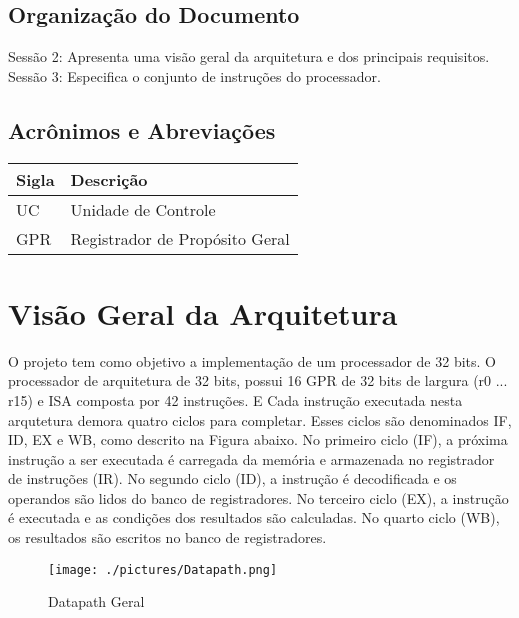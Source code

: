 \documentclass{report}
\begin{document}
\section{Organização do Documento} 
Sessão 2: Apresenta uma visão geral da arquitetura e dos principais requisitos. \newline
Sessão 3: Especifica o conjunto de instruções do processador.

 \section{Acrônimos e Abreviações}
   \FloatBarrier
    \begin{table}[H]
      \begin{center}
        \begin{tabular}[pos]{|m{2cm} | m{12cm}|} 
          \hline
          \cellcolor[gray]{0.9}\textbf{Sigla} & \cellcolor[gray]{0.9}\textbf{Descrição} \\ \hline
             UC      &  Unidade de Controle\\ \hline
             GPR   & {Registrador de Propósito Geral}\\ \hline
        \end{tabular}
      \end{center}
    \end{table}  
  
  
\newpage
\chapter{Visão Geral da Arquitetura}
O projeto tem como objetivo a implementação de um processador de 32 bits. O processador de arquitetura de 32 bits, possui 16 GPR de 32 bits de largura (r0 ... r15) e ISA composta por 42 instruções.
E Cada instrução executada nesta arqutetura demora quatro ciclos para completar. Esses ciclos são denominados IF, ID, EX e WB, como descrito na Figura abaixo. No primeiro ciclo (IF), a próxima instrução a ser executada é carregada da memória e armazenada no registrador de instruções (IR). No segundo ciclo (ID), a instrução é decodificada e os operandos são lidos do banco de registradores. No terceiro ciclo (EX), a instrução é executada e as condições dos resultados  são calculadas. No quarto ciclo (WB), os resultados são escritos no banco de registradores.

\begin{figure}[H]
	\centering
	\texttt{[image: ./pictures/Datapath.png]}
	\caption{Datapath Geral}
\end{figure}
\end{document}
